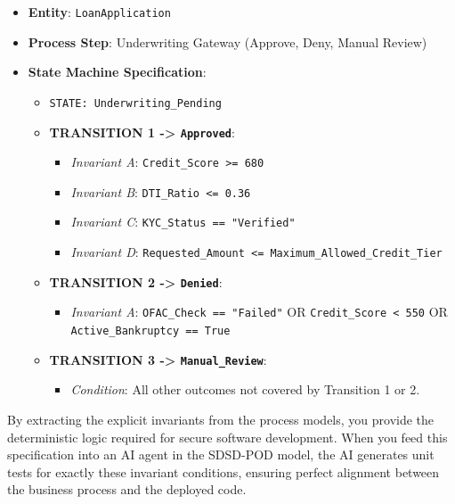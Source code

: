 \begin{itemize}
\tightlist
\item
  \textbf{Entity}: \texttt{LoanApplication}
\item
  \textbf{Process Step}: Underwriting Gateway (Approve, Deny, Manual
  Review)
\item
  \textbf{State Machine Specification}:

  \begin{itemize}
  \tightlist
  \item
    \texttt{STATE:\ Underwriting\_Pending}
  \item
    \textbf{TRANSITION 1 -\textgreater{} \texttt{Approved}}:

    \begin{itemize}
    \tightlist
    \item
      \emph{Invariant A}: \texttt{Credit\_Score\ \textgreater{}=\ 680}
    \item
      \emph{Invariant B}: \texttt{DTI\_Ratio\ \textless{}=\ 0.36}
    \item
      \emph{Invariant C}: \texttt{KYC\_Status\ ==\ "Verified"}
    \item
      \emph{Invariant D}:
      \texttt{Requested\_Amount\ \textless{}=\ Maximum\_Allowed\_Credit\_Tier}
    \end{itemize}
  \item
    \textbf{TRANSITION 2 -\textgreater{} \texttt{Denied}}:

    \begin{itemize}
    \tightlist
    \item
      \emph{Invariant A}: \texttt{OFAC\_Check\ ==\ "Failed"} OR
      \texttt{Credit\_Score\ \textless{}\ 550} OR
      \texttt{Active\_Bankruptcy\ ==\ True}
    \end{itemize}
  \item
    \textbf{TRANSITION 3 -\textgreater{} \texttt{Manual\_Review}}:

    \begin{itemize}
    \tightlist
    \item
      \emph{Condition}: All other outcomes not covered by Transition 1
      or 2.
    \end{itemize}
  \end{itemize}
\end{itemize}

By extracting the explicit invariants from the process models, you
provide the deterministic logic required for secure software
development. When you feed this specification into an AI agent in the
SDSD-POD model, the AI generates unit tests for exactly these invariant
conditions, ensuring perfect alignment between the business process and
the deployed code.

